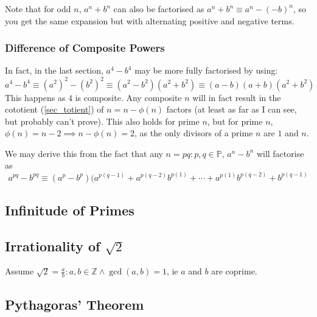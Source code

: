 \documentclass[fleqn,a4paper,11pt]{article}
\begin{document}
    Note that for odd \(n\), \(a^n + b^n\) can also be factorised as
    \(a^n + b^n \equiv a^n - (-b)^n\), so you get the same expansion but with
    alternating positive and negative terms.


    \subsubsection{Difference of Composite Powers}

    In fact, in the last section, \(a^4 - b^4\) may be more fully factorised by
    using:
    \begin{equation*}
    a^4 - b^4 \equiv (a^2)^2 - (b^2)^2 \equiv (a^2 - b^2)(a^2 + b^2) \equiv
        (a - b)(a + b)(a^2 + b^2)
    \end{equation*}
    This happens as \(4\) is composite. Any composite \(n\) will in fact result
    in the cototient (\ref{sec_totient}) of \(n = n - \phi(n)\) factors (at
    least as far as I can see, but probably can't prove). This
    also holds for prime \(n\), but for prime \(n\),
    \(\phi(n) = n - 2 \implies n - \phi(n) = 2\), as the only divisors of
    a prime \(n\) are \(1\) and \(n\).

    We may derive this from the fact that any \(n = pq: p, q \in \mathbb P\),
    \(a^n - b^n\) will factorise as
    \begin{equation}
    a^{pq} - b^{pq} \equiv
     (a^p - b^p)(a^{p(q - 1)} + a^{p(q - 2)}b^{p(1)} + \dotsb +
                 a^{p(1)}b^{p(q - 2)} + b^{p(q - 1)}
    \end{equation}

    \subsection{Infinitude of Primes}

    \subsection[Irrationality of \(\sqrt 2\)]
               {Irrationality of \boldmath\(\sqrt 2\)}

    Assume \(\sqrt 2 = \frac ab : a, b \in \mathbb Z \land \gcd(a, b) = 1\), ie
    \(a\) and \(b\) are coprime.

    \subsection{Pythagoras' Theorem} \label{sec_pythagoras}
\end{document}
